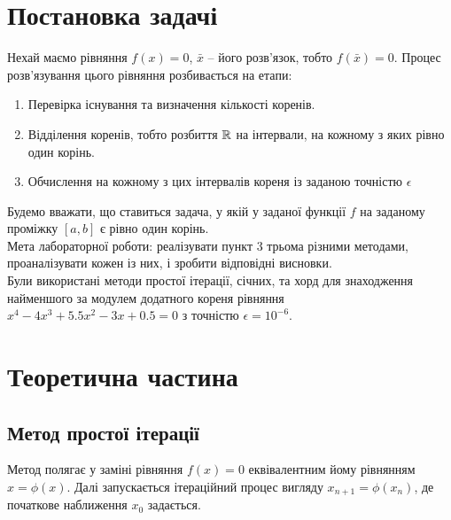 

\allowdisplaybreaks




\section{Постановка задачі} 

Нехай маємо рівняння $f(x) = 0$, $\bar x$ -- його розв'язок, тобто $f(\bar x)=0$. Процес розв'язування цього рівняння розбивається на етапи: 
\begin{enumerate}
\item Перевірка існування та визначення кількості коренів.
\item Відділення коренів, тобто розбиття $\mathbb{R}$ на інтервали, на кожному з яких рівно один корінь.
\item Обчислення на кожному з цих інтервалів кореня із заданою точністю  $\epsilon$
\end{enumerate}

Будемо вважати, що ставиться задача, у якій у заданої функції $f$ на заданому проміжку $[a, b]$ є рівно один корінь.\\

Мета лабораторної роботи: реалізувати пункт 3 трьома різними методами, проаналізувати кожен із них, і зробити відповідні висновки.\\

Були використані методи простої ітерації, січних, та хорд для знаходження найменшого за модулем додатного кореня рівняння $x^4 - 4 x^3 + 5.5 x^2 - 3x + 0.5 = 0$ з точністю $\epsilon = 10^{-6}$.

\section{Теоретична частина} 

\subsection{Метод простої ітерації}

Метод полягає у заміні рівняння $f(x) = 0$ еквівалентним йому рівнянням $x = \phi(x)$. Далі запускається ітераційний процес вигляду $x_{n + 1} = \phi(x_n)$, де початкове наближення $x_0$ задається. \\

